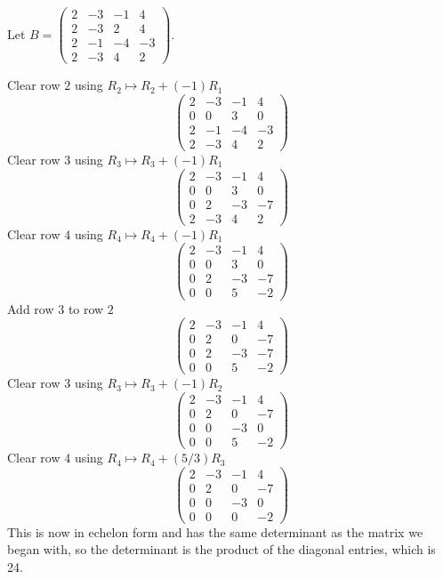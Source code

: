 \documentclass{article}
\begin{document}
\begin{Example}
Let \(B=\begin{pmatrix} 2 & -3 & -1 & 4 \\ 2 & -3 & 2 & 4 \\ 2 & -1
& -4 & -3 \\ 2 & -3 & 4 & 2 \end{pmatrix}\).


Clear row \(2\) using \(R_2\mapsto R_2+(-1)R_1\)\[\begin{pmatrix} 2
& -3 & -1 & 4 \\ 0 & 0 & 3 & 0 \\ 2 & -1 & -4 & -3 \\ 2 & -3 & 4 & 2
\end{pmatrix}\] Clear row \(3\) using \(R_3\mapsto
R_3+(-1)R_1\)\[\begin{pmatrix} 2 & -3 & -1 & 4 \\ 0 & 0 & 3 & 0 \\ 0
& 2 & -3 & -7 \\ 2 & -3 & 4 & 2 \end{pmatrix}\] Clear row \(4\) using
\(R_4\mapsto R_4+(-1)R_1\)\[\begin{pmatrix} 2 & -3 & -1 & 4 \\ 0 & 0
& 3 & 0 \\ 0 & 2 & -3 & -7 \\ 0 & 0 & 5 & -2 \end{pmatrix}\]Add row
\(3\) to row \(2\)\[\begin{pmatrix} 2 & -3 & -1 & 4 \\ 0 & 2 & 0 &
-7 \\ 0 & 2 & -3 & -7 \\ 0 & 0 & 5 & -2 \end{pmatrix}\] Clear row
\(3\) using \(R_3\mapsto R_3+(-1)R_2\)\[\begin{pmatrix} 2 & -3 & -1
& 4 \\ 0 & 2 & 0 & -7 \\ 0 & 0 & -3 & 0 \\ 0 & 0 & 5 & -2
\end{pmatrix}\] Clear row \(4\) using \(R_4\mapsto
R_4+(5/3)R_3\)\[\begin{pmatrix} 2 & -3 & -1 & 4 \\ 0 & 2 & 0 & -7
\\ 0 & 0 & -3 & 0 \\ 0 & 0 & 0 & -2 \end{pmatrix}\]This is now in
echelon form and has the same determinant as the matrix we began
with, so the determinant is the product of the diagonal entries,
which is 24.


\end{Example}
\end{document}
